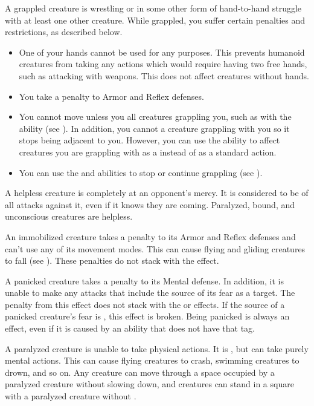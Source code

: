    A grappled creature is wrestling or in some other form of hand-to-hand struggle with at least one other creature.
  While grappled, you suffer certain penalties and restrictions, as described below.
  \begin{itemize}
    \item One of your hands cannot be used for any purposes.
      This prevents humanoid creatures from taking any actions which would require having two free hands, such as attacking with  weapons.
      This does not affect creatures without hands.
    \item You take a  penalty to Armor and Reflex defenses.
    \item You cannot move unless you  all creatures grappling you, such as with the  ability (see ).
      In addition, you cannot  a creature grappling with you so it stops being adjacent to you.
      However, you can use the  ability to affect creatures you are grappling with as a  instead of as a standard action.
    \item You can use the  and  abilities to stop or continue grappling (see ).
  \end{itemize}

   A helpless creature is completely at an opponent's mercy.
  It is considered to be \unaware of all attacks against it, even if it knows they are coming.
  Paralyzed, bound, and unconscious creatures are helpless.

   An immobilized creature takes a  penalty to its Armor and Reflex defenses and can't use any of its movement modes.
  This can cause flying and gliding creatures to fall (see ).
  These penalties do not stack with the \slowed effect.

   A panicked creature takes a  penalty to its Mental defense.
  In addition, it is unable to make any attacks that include the source of its fear as a target.
  The penalty from this effect does not stack with the \frightened or \panicked effects.
  If the source of a panicked creature's fear is , this effect is broken.
  Being panicked is always an  effect, even if it is caused by an ability that does not have that tag.

   A paralyzed creature is unable to take physical actions. It is \helpless, but can take purely mental actions. This can cause flying creatures to crash, swimming creatures to drown, and so on. Any creature can move through a space occupied by a paralyzed creature without slowing down, and creatures can stand in a square with a paralyzed creature without \squeezing.

